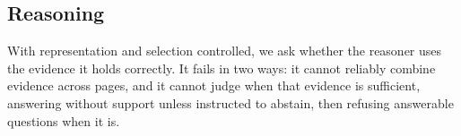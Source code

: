 \documentclass[11pt]{article}
\begin{document}



\subsection{Reasoning}
\label{sec:reasoning}
With representation and selection controlled, we ask whether the reasoner uses the evidence it holds correctly. It fails in two ways: it cannot reliably combine evidence across pages, and it cannot judge when that evidence is sufficient, answering without support unless instructed to abstain, then refusing answerable questions when it is.

\end{document}
